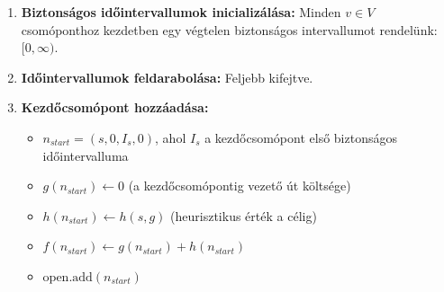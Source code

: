 \documentclass[a4paper,12pt]{article}
\begin{document}
\begin{enumerate}
    \item \textbf{Biztonságos időintervallumok inicializálása:}
    Minden $v \in V$ csomóponthoz kezdetben egy végtelen biztonságos intervallumot rendelünk: $[0, \infty)$.

    \item \textbf{Időintervallumok feldarabolása:}
    Feljebb kifejtve.

    \item \textbf{Kezdőcsomópont hozzáadása:}
    \begin{itemize}
        \item $n_{start} = (s, 0, I_s, 0)$, ahol $I_s$ a kezdőcsomópont első biztonságos időintervalluma
        \item $g(n_{start}) \gets 0$ (a kezdőcsomópontig vezető út költsége)
        \item $h(n_{start}) \gets h(s, g)$ (heurisztikus érték a célig)
        \item $f(n_{start}) \gets g(n_{start}) + h(n_{start})$
        \item $\text{open}.\text{add}(n_{start})$
    \end{itemize}


\end{enumerate}
\end{document}
